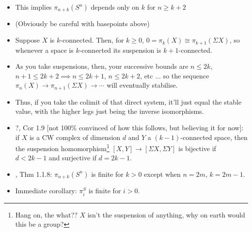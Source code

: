 \documentclass{MetricNotes2023}
\begin{document}
\begin{itemize}
\item This implies \(\pi_{n+k}(S^n)\) depends only on \(k\) for \(n\geq k+2\)
\item (Obviously be careful with basepoints above)
\item Suppose \(X\) is \(k\)-connected. Then, for \(k\geq 0\), \(0=\pi_k(X)\cong \pi_{k+1}(\Sigma X)\), so whenever a space is \(k\)-connected its suspension is \(k+1\)-connected. 
\item As you take suspensions, then, your successive bounds are \(n \leq 2k\), \(n+1\leq 2k+2\implies n \leq 2k+1\), \(n\leq 2k+2\), etc ... so the sequence \(\pi_n(X)\to \pi_{n+1}(\Sigma X)\to \cdots\) will eventually stabilise.  
\item Thus, if you take the colimit of that direct system, it'll just equal the stable value, with the higher legs just being the inverse isomorphisms.
\item ?\autocite{ass}, Cor 1.9 [not 100\% convinced of how this follows, but believing it for now]: if \(X\) is a CW complex of dimension \(d\) and \(Y\) a \((k-1)\)-connected space, then the suspension homomorphism\footnote{Hang on, the what?? \(X\) isn't the suspension of anything, why on earth would this be a group?} \([X, Y]\to[\Sigma X, \Sigma Y]\) is bijective if \(d<2k-1\) and surjective if \(d=2k-1\). 

\item \autocite{cobordism}, Thm 1.1.8: \(\pi_{n+k}(S^n)\) is finite for \(k>0\) except when \(n=2m\), \(k=2m-1\). 

\item Immediate corollary: \(\pi_i^S\) is finite for \(i>0\). 
\end{itemize}
\end{document}
